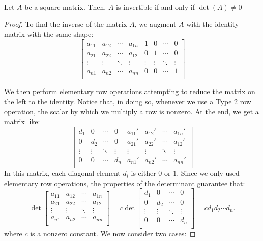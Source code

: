 \documentclass[12pt]{article}
\begin{document}
\begin{theorem} Let $A$ be a square matrix. Then, $A$ is invertible if and only if $\det(A)\ne0$
\end{theorem}
\begin{proof} To find the inverse of the matrix $A$, we augment $A$ with the identity matrix with the same shape:
\[
\begin{bmatrix}
a_{11} & a_{12} & \cdots & a_{1n} & 1 & 0 &\cdots &0\\
a_{21} & a_{22} & \cdots & a_{12} & 0 & 1 &\cdots &0\\
\vdots & \vdots & \ddots & \vdots & \vdots & \vdots & \ddots & \vdots\\
a_{n1} & a_{n2} & \cdots & a_{nn} & 0 & 0 &\cdots &1\\
\end{bmatrix}
\]

We then perform elementary row operations attempting to reduce the matrix on the left to the identity. Notice that, in doing so, whenever we use a Type 2 row operation, the scalar by which we multiply a row is nonzero. At the end, we get a matrix like:
\[
\begin{bmatrix}
 d_1 & 0 &\cdots & 0 & a_{11}' & a_{12}' & \cdots & a_{1n}' \\
 0 & d_2 &\cdots & 0 & a_{21}' & a_{22}' & \cdots & a_{12}' \\
\vdots & \vdots & \ddots & \vdots & \vdots & \vdots & \ddots & \vdots\\
 0 & 0 &\cdots & d_n &a_{n1}' & a_{n2}' & \cdots & a_{nn}' \\
\end{bmatrix}
\]
In this matrix, each diagonal element $d_i$ is either $0$ or $1$. Since we only used elementary row operations, the properties of the determinant guarantee that:
\[
\det
\begin{bmatrix}
a_{11} & a_{12} & \cdots & a_{1n} \\
a_{21} & a_{22} & \cdots & a_{12} \\
\vdots & \vdots & \ddots & \vdots \\
a_{n1} & a_{n2} & \cdots & a_{nn} \\
\end{bmatrix}
=c
\det
\begin{bmatrix}
 d_1 & 0 &\cdots & 0  \\
 0 & d_2 &\cdots & 0 \\
\vdots & \vdots & \ddots & \vdots \\
 0 & 0 &\cdots & d_n  \\
\end{bmatrix}=cd_1d_2\cdots d_n.
\]
where $c$ is a nonzero constant. We now consider two cases:


\end{proof}
\end{document}
